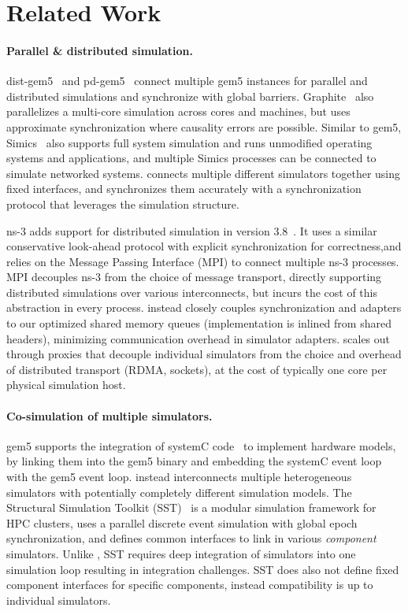 \section{Related Work}

\paragraph{Parallel \& distributed simulation.}
dist-gem5~\cite{mohammad:distgem5} and pd-gem5~\cite{alian:pd-gem5}
connect multiple gem5 instances for parallel and distributed
simulations and synchronize with global barriers.
%
Graphite~\cite{miller:graphite} also parallelizes a multi-core
simulation across cores and machines, but uses approximate
synchronization where causality errors are possible.
%
Similar to gem5, Simics~\cite{magnusson:simics} also supports full
system simulation and runs unmodified operating systems and
applications, and multiple Simics processes can be connected to
simulate networked systems.
%
\sysname connects multiple different simulators together using
fixed interfaces, and synchronizes them accurately with a
synchronization protocol that leverages the simulation structure.

ns-3 adds support for distributed simulation in version 3.8~\cite{dist-ns3}.
%
It uses a similar conservative look-ahead protocol with explicit
synchronization for correctness,and relies on the Message Passing
Interface (MPI) to connect multiple ns-3 processes.
%
MPI decouples ns-3 from the choice of message transport, directly
supporting distributed simulations over various interconnects, but
incurs the cost of this abstraction in every process.
%
\sysname instead closely couples synchronization and adapters to
our optimized shared memory queues (implementation is inlined from
shared headers), minimizing communication overhead in
simulator adapters.
%
\sysname scales out through proxies that decouple individual
simulators from the choice and overhead of distributed
transport (RDMA, sockets), at the cost of typically one core per
physical simulation host.

\paragraph{Co-simulation of multiple simulators.}
gem5 supports the integration of systemC
code~\cite{menard:gem5systemc} to implement hardware models, by
linking them into the gem5 binary and embedding the systemC event loop
with the gem5 event loop.
%
\sysname instead interconnects multiple heterogeneous simulators with
potentially completely different simulation models.
%
The Structural Simulation Toolkit (SST)~\cite{rodrigues:sst} is a
modular simulation framework for HPC clusters, uses a parallel
discrete event simulation with global epoch synchronization, and
defines common interfaces to link in various \textit{component}
simulators.
%
Unlike \sysname, SST requires deep integration of simulators into one
simulation loop resulting in integration challenges.
%
SST does also not define fixed component interfaces for specific
components, instead compatibility is up to individual simulators.

